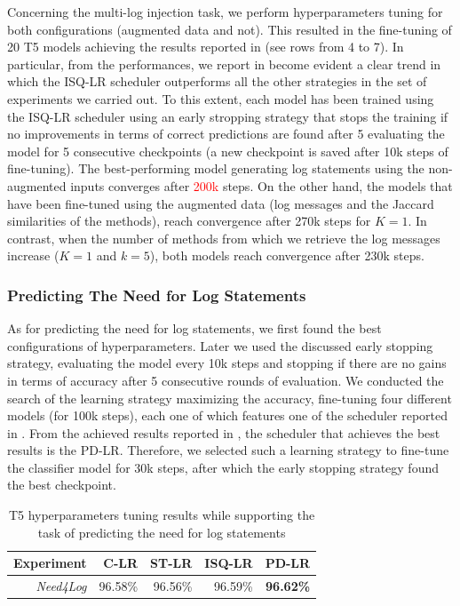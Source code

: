 Concerning the multi-log injection task, we perform hyperparameters tuning for both configurations (\ie augmented data and not). This resulted in the fine-tuning of 20 T5 models achieving the results reported in  (see rows from 4 to 7). In particular, from the performances, we report in  become evident a clear trend in which the ISQ-LR scheduler outperforms all the other strategies in the set of experiments we carried out. To this extent, each model has been trained using the ISQ-LR scheduler using an early stropping strategy that stops the training if no improvements in terms of correct predictions are found after 5 evaluating the model for 5 consecutive checkpoints (a new checkpoint is saved after 10k steps of fine-tuning).
The best-performing model generating log statements using the non-augmented inputs converges after \textcolor{red}{200k} steps.
On the other hand, the models that have been fine-tuned using the augmented data (\ie log messages and the Jaccard similarities of the methods), reach convergence after 270k steps for $K=1$. In contrast, when the number of methods from which we retrieve the log messages increase (\ie $K=1$ and $k=5$), both models reach convergence after 230k steps.

\subsubsection{Predicting The Need for Log Statements}
As for predicting the need for log statements, we first found the best configurations of hyperparameters. Later we used the discussed early stopping strategy, evaluating the model every 10k steps and stopping if there are no gains in terms of accuracy after 5 consecutive rounds of evaluation.
We conducted the search of the learning strategy maximizing the accuracy, fine-tuning four different models (for 100k steps), each one of which features one of the scheduler reported in  . From the achieved results reported in , the scheduler that achieves the best results is the PD-LR. Therefore, we selected such a learning strategy to fine-tune the classifier model for 30k steps, after which the early stopping strategy found the best checkpoint.

  \begin{table}[h!]
	\centering
	\caption{T5 hyperparameters tuning results while supporting the task of predicting the need for log statements}
	\begin{tabular}{rrrrr}
		\hline
		\textbf{Experiment}        & \textbf{C-LR} & \textbf{ST-LR} & \textbf{ISQ-LR}  & \textbf{PD-LR}  \\ \hline
		\textit{Need4Log} & 96.58\%       & 96.56\%        & 96.59\%          & \textbf{96.62\%}\\ \hline
	\end{tabular}
	\label{tab:need4log-hp}
\end{table}

